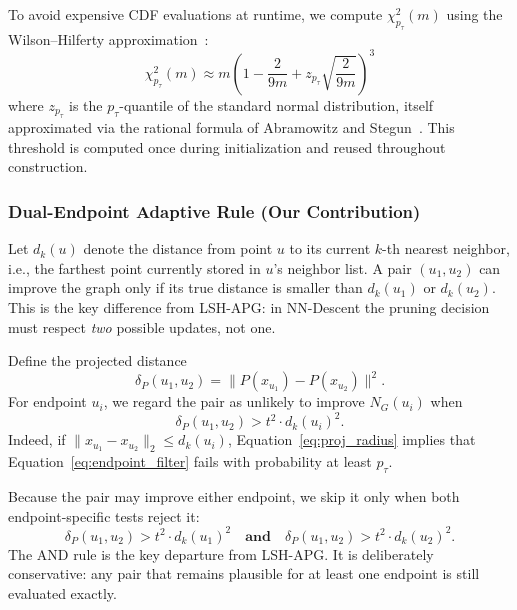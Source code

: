 To avoid expensive CDF evaluations at runtime, we compute $\chi^2_{p_\tau}(m)$ using the Wilson--Hilferty approximation~\cite{wilson1931distribution}:
\begin{equation}
    \chi^2_{p_\tau}(m) \approx m \left(1 - \frac{2}{9m} + z_{p_\tau} \sqrt{\frac{2}{9m}}\right)^{\!3}
    \label{eq:wilson_hilferty}
\end{equation}
where $z_{p_\tau}$ is the $p_\tau$-quantile of the standard normal distribution, itself approximated via the rational formula of Abramowitz and Stegun~\cite{abramowitz1964handbook}. This threshold is computed once during initialization and reused throughout construction.

\subsubsection{Dual-Endpoint Adaptive Rule (Our Contribution)}

Let $d_k(u)$ denote the distance from point $u$ to its current $k$-th nearest neighbor, i.e., the farthest point currently stored in $u$'s neighbor list. A pair $(u_1,u_2)$ can improve the graph only if its true distance is smaller than $d_k(u_1)$ or $d_k(u_2)$. This is the key difference from LSH-APG: in NN-Descent the pruning decision must respect \emph{two} possible updates, not one.

Define the projected distance
\begin{equation}
    \delta_P(u_1,u_2) = \|P(x_{u_1}) - P(x_{u_2})\|^2.
    \label{eq:proj_delta}
\end{equation}
For endpoint $u_i$, we regard the pair as unlikely to improve $N_G(u_i)$ when
\begin{equation}
    \delta_P(u_1,u_2) > t^2 \cdot d_k(u_i)^2.
    \label{eq:endpoint_filter}
\end{equation}
Indeed, if $\|x_{u_1} - x_{u_2}\|_2 \leq d_k(u_i)$, Equation~\eqref{eq:proj_radius} implies that Equation~\eqref{eq:endpoint_filter} fails with probability at least $p_\tau$.

Because the pair may improve either endpoint, we skip it only when both endpoint-specific tests reject it:
\begin{equation}
    \delta_P(u_1,u_2) > t^2 \cdot d_k(u_1)^2
    \quad \textbf{and} \quad
    \delta_P(u_1,u_2) > t^2 \cdot d_k(u_2)^2.
    \label{eq:proj_filter}
\end{equation}
The AND rule is the key departure from LSH-APG. It is deliberately conservative: any pair that remains plausible for at least one endpoint is still evaluated exactly.


